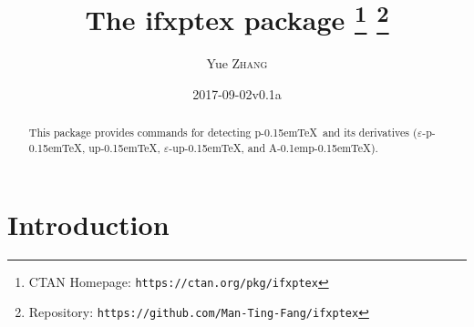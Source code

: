 \documentclass[a4paper]{article}
\newcommand\NormalSans{\normalfont\sffamily}
\newcommand\pkg[1]{{\protect\NormalSans#1}}
\newcommand\pTeX{p\kern-0.15em\TeX}
\newcommand\e{\ensuremath{\varepsilon}}
\newcommand\epTeX{\e-\pTeX}
\newcommand\upTeX{u\pTeX}
\newcommand\eupTeX{\e-\upTeX}
\newcommand\ApTeX{A\kern-0.1em\pTeX}
\begin{document}
\title{The \pkg{ifxptex} package%
  \thanks{CTAN Homepage: \texttt{https://ctan.org/pkg/ifxptex}}
  \thanks{Repository: \texttt{https://github.com/Man-Ting-Fang/ifxptex}}}
\author{Yue \textsc{Zhang}}
\date{2017-09-02\quad v0.1a}

\maketitle

\begin{abstract}
This package provides commands for detecting \pTeX\ and its derivatives (\epTeX,
\upTeX, \eupTeX, and \ApTeX).
\end{abstract}

\section{Introduction}
\end{document}
